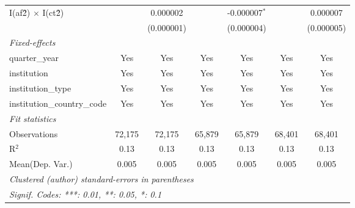 \begin{tabular}{lcccccc}
   I(af\^2) $\times$ I(ct\^2)         &               & 0.000002      &               & -0.000007$^{*}$ &               & 0.000007\\   
                                      &               & (0.000001)    &               & (0.000004)      &               & (0.000005)\\   
   \midrule
   \emph{Fixed-effects}\\
   quarter\_year                      & Yes           & Yes           & Yes           & Yes             & Yes           & Yes\\  
   institution                        & Yes           & Yes           & Yes           & Yes             & Yes           & Yes\\  
   institution\_type                  & Yes           & Yes           & Yes           & Yes             & Yes           & Yes\\  
   institution\_country\_code         & Yes           & Yes           & Yes           & Yes             & Yes           & Yes\\  
   \midrule
   \emph{Fit statistics}\\
   Observations                       & 72,175        & 72,175        & 65,879        & 65,879          & 68,401        & 68,401\\  
   R$^2$                              & 0.13          & 0.13          & 0.13          & 0.13            & 0.13          & 0.13\\  
Mean(Dep. Var.) & 0.005 & 0.005 & 0.005 & 0.005 & 0.005 & 0.005 \\
   \midrule \midrule
   \multicolumn{7}{l}{\emph{Clustered (author) standard-errors in parentheses}}\\
   \multicolumn{7}{l}{\emph{Signif. Codes: ***: 0.01, **: 0.05, *: 0.1}}\\
\end{tabular}
\par\endgroup
